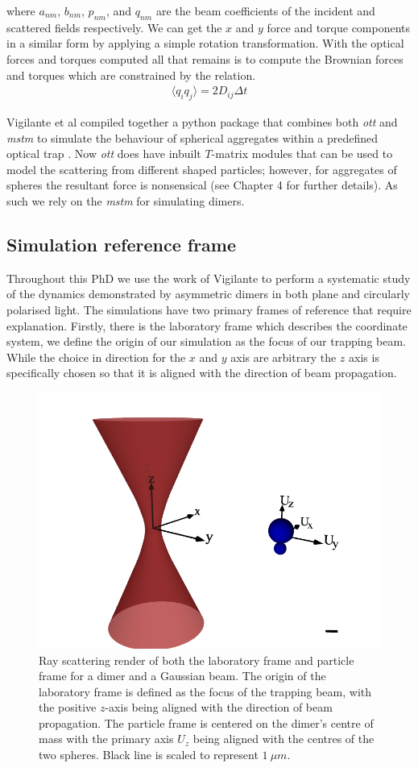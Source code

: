 where $a_{nm}$, $b_{nm}$, $p_{nm}$, and $q_{nm}$ are the beam 
coefficients of the incident and scattered fields respectively. 
We can get the $x$ and $y$ force and torque components in a 
similar form by applying a simple rotation transformation. With 
the optical forces and torques computed all that remains is to 
compute the Brownian forces and torques which are constrained 
by the relation.
\begin{align}
	\langle q_iq_j\rangle =2D_{ij}\Delta t
\end{align}

Vigilante et al compiled together a python package that combines 
both \textit{ott} and \textit{mstm} to simulate the behaviour of 
spherical aggregates within a predefined optical trap 
\cite{Vigilante2020}. Now \textit{ott} does have inbuilt $T$-matrix 
modules that can be used to model the scattering from different 
shaped particles; however, for aggregates of spheres the resultant 
force is nonsensical (see Chapter 4 for further details). As such 
we rely on the \textit{mstm} for simulating dimers.  

\subsection{Simulation reference frame}
\label{sec:sim_parameters}
Throughout this PhD we use the work of Vigilante to perform a systematic 
study of the dynamics demonstrated by asymmetric dimers in both plane and 
circularly polarised light. The simulations have two primary frames of 
reference that require explanation. Firstly, there is the laboratory frame 
which describes the coordinate system, we define the origin of our simulation
as the focus of our trapping beam. While the choice in direction for the $x$ 
and $y$ axis are arbitrary the $z$ axis is specifically chosen so that it is 
aligned with the direction of beam propagation. 
\begin{figure}[h!]
	\centering
	\includegraphics[width=0.6\linewidth]{lab_frame.png}
	\caption{Ray scattering render of both the laboratory frame and particle 
		frame for a dimer and a Gaussian beam. The origin of the laboratory 
		frame is defined as the focus of the trapping beam, with the positive 
		$z$-axis being aligned with the direction of beam propagation. The 
		particle frame is centered on the dimer's centre of mass with the 
		primary axis $U_z$ being aligned with the centres of the two spheres.
		Black line is scaled to represent $1\ \mu m$.}
	\label{fig:lab_frame} 
\end{figure} 

